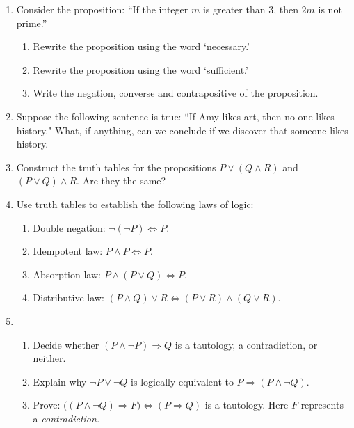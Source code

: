 \begin{exercises}{}{}
\begin{enumerate}
  
	  \item Consider the proposition: ``If the integer $m$ is greater than 3, then $2m$ is not prime.''
	  \begin{enumerate}
	    \item Rewrite the proposition using the word `necessary.'
	 		\item Rewrite the proposition using the word  `sufficient.'
	 		\item Write the negation, converse and contrapositive of the proposition. 
	  \end{enumerate}
	  

  	\item Suppose the following sentence is true: ``If Amy likes art, then no-one likes history." What, if anything, can we conclude if we discover that someone likes history.
  
  
  	\goodbreak
	  
	  
	  \item Construct the truth tables for the propositions $P\vee(Q\wedge R)$ and $(P\vee Q)\wedge R$. Are they the same?
   
   
  	\goodbreak
  
  
		\item Use truth tables to establish the following laws of logic:
		\begin{enumerate}
		  \item Double negation: \lstsp $\neg(\neg P)\iff P$.
		  \item Idempotent law: \lstsp $P\wedge P\iff P$.
		  \item Absorption law: \lstsp $P\wedge(P\vee Q)\iff P$.
		  \item Distributive law: \lstsp $(P\wedge Q)\vee R\iff (P\vee R)\wedge(Q\vee R)$.
		\end{enumerate}
  
  
	  \item\begin{enumerate}
	    \item Decide whether $(P\wedge \neg P) \Longrightarrow Q$ is a tautology, a contradiction, or neither.
	    \item Explain why $\neg P \vee \neg Q$ is logically equivalent to $P \Longrightarrow (P \wedge\neg Q)$.
	    \item\label{exs:contradictproof} Prove: $\bigl((P\wedge \neg Q)\Longrightarrow F\bigr)\Longleftrightarrow  (P\Longrightarrow Q)$ is a tautology. Here $F$ represents a \emph{contradiction.}
	  \end{enumerate}
	  

\end{enumerate}
\end{exercises}
